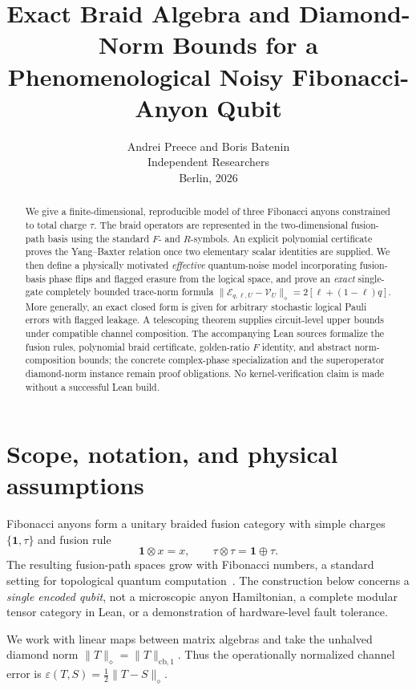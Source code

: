 \documentclass[11pt,a4paper]{article}
\title{\textbf{Exact Braid Algebra and Diamond-Norm Bounds for a Phenomenological Noisy Fibonacci-Anyon Qubit}}
\author{Andrei Preece and Boris Batenin\\[4pt]Independent Researchers\\Berlin, 2026}
\date{}
\theoremstyle{remark}
\newcommand{\one}{\mathbf{1}}
\begin{document}
\maketitle
\begin{abstract}
We give a finite-dimensional, reproducible model of three Fibonacci anyons constrained to total charge $\tau$. The braid operators are represented in the two-dimensional fusion-path basis using the standard $F$- and $R$-symbols. An explicit polynomial certificate proves the Yang--Baxter relation once two elementary scalar identities are supplied. We then define a physically motivated \emph{effective} quantum-noise model incorporating fusion-basis phase flips and flagged erasure from the logical space, and prove an \emph{exact} single-gate completely bounded trace-norm formula
$\|\mathcal E_{q,\ell,U}-\mathcal V_U\|_\diamond=2[\ell+(1-\ell)q]$.
More generally, an exact closed form is given for arbitrary stochastic logical Pauli errors with flagged leakage. A telescoping theorem supplies circuit-level upper bounds under compatible channel composition. The accompanying Lean sources formalize the fusion rules, polynomial braid certificate, golden-ratio $F$ identity, and abstract norm-composition bounds; the concrete complex-phase specialization and the superoperator diamond-norm instance remain proof obligations. No kernel-verification claim is made without a successful Lean build.
\end{abstract}

\section{Scope, notation, and physical assumptions}
Fibonacci anyons form a unitary braided fusion category with simple charges $\{\one,\tau\}$ and fusion rule
\begin{equation}\label{eq:fusion}
\one\otimes x=x,\qquad \tau\otimes\tau=\one\oplus\tau.
\end{equation}
The resulting fusion-path spaces grow with Fibonacci numbers, a standard setting for topological quantum computation~\cite{bonesteel2005,hormozi2007,trebst2008}. The construction below concerns a \emph{single encoded qubit}, not a microscopic anyon Hamiltonian, a complete modular tensor category in Lean, or a demonstration of hardware-level fault tolerance.

We work with linear maps between matrix algebras and take the unhalved diamond norm $\|T\|_\diamond=\|T\|_{\mathrm{cb},1}$. Thus the operationally normalized channel error is $\varepsilon(T,S)=\tfrac12\|T-S\|_\diamond$.
\end{document}
